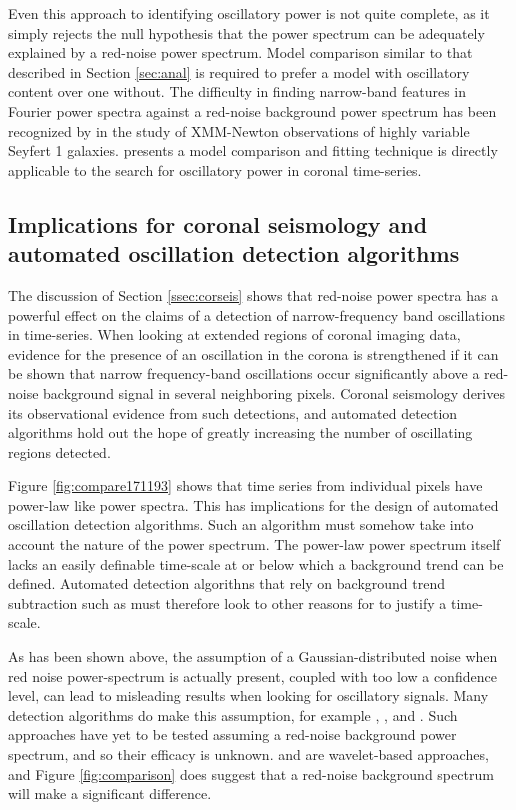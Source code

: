 \documentclass[preprint]{../aastex52/aastex}
\begin{document}
Even this approach to identifying oscillatory power is not quite
complete, as it simply rejects the null hypothesis that the power
spectrum can be adequately explained by a red-noise power spectrum.
Model comparison similar to that described in Section \ref{sec:anal}
is required to prefer a model with oscillatory content over one
without. The difficulty in finding narrow-band features in Fourier
power spectra against a red-noise background power spectrum has been
recognized by \cite{2010MNRAS.402..307V} in the study of XMM-Newton
observations of highly variable Seyfert 1 galaxies.
\cite{2010MNRAS.402..307V} presents a model comparison and fitting
technique is directly applicable to the search for oscillatory power
in coronal time-series.


\subsection{Implications for coronal seismology and automated
  oscillation detection algorithms}\label{sec:oscdetect}

The discussion of Section \ref{ssec:corseis} shows that red-noise
power spectra has a powerful effect on the claims of a detection of
narrow-frequency band oscillations in time-series.  When looking at
extended regions of coronal imaging data, evidence for the presence of
an oscillation in the corona is strengthened if it can be shown that
narrow frequency-band oscillations occur significantly above a
red-noise background signal in several neighboring pixels.  Coronal
seismology derives its observational evidence from such detections,
and automated detection algorithms hold out the hope of greatly
increasing the number of oscillating regions detected.

Figure \ref{fig:compare171193} shows that time series from individual
pixels have power-law like power spectra.  This has implications for
the design of automated oscillation detection algorithms.  Such an
algorithm must somehow take into account the nature of the power
spectrum.  The power-law power spectrum itself lacks an easily
definable time-scale at or below which a background trend can be
defined.  Automated detection algorithns that rely on background trend
subtraction such as \cite{2010SoPh..264..403I} must therefore look to
other reasons for to justify a time-scale.

As has been shown above, the assumption of a Gaussian-distributed
noise when red noise power-spectrum is actually present, coupled with
too low a confidence level, can lead to misleading results when
looking for oscillatory signals.  Many detection algorithms do make
this assumption, for example \cite{2004SoPh..223....1D},
\cite{2007SoPh..241..397N}, \cite{2008SoPh..248..395S} and
\cite{2010SoPh..264..403I}.  Such approaches have yet to be tested
assuming a red-noise background power spectrum, and so their efficacy
is unknown.  \cite{2004SoPh..223....1D} and \cite{2008SoPh..248..395S}
are wavelet-based approaches, and Figure \ref{fig:comparison} does
suggest that a red-noise background spectrum will make a significant
difference. 
\end{document}
